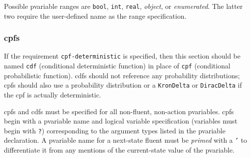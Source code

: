 \documentclass[11pt,a4paper]{article}
\begin{document}
Possible pvariable ranges are
\texttt{bool}, \texttt{int}, \texttt{real}, \emph{object}, or
\emph{enumerated}.  The latter two require the user-defined
name as the range specification.

\subsubsection{cpfs}

\label{sec:cpfs}

If the requirement \texttt{cpf-deterministic} is specified, then this
section should be named \texttt{cdf} (conditional deterministic
function) in place of \texttt{cpf} (conditional probabilistic
function).  cdfs should not reference any probability distributions;
cpfs should also use a probability distribution or a \texttt{KronDelta}
or \texttt{DiracDelta} if the cpf is actually deterministic.

cpfs and cdfs must be specified for all non-fluent, non-action
pvariables.  cpfs begin with a pvariable name and logical 
variable specification (variables must begin with \texttt{?})
corresponding to the argument types listed in the pvariable
declaration.  A pvariable name for a next-state fluent must
be \emph{primed} with a \texttt{'} to differentiate it from any
mentions of the current-state value of the pvariable.
\end{document}
